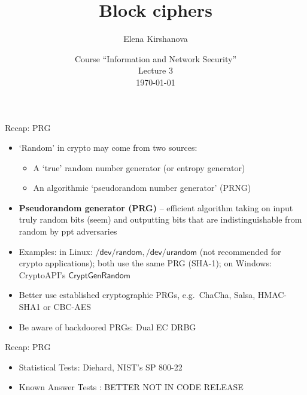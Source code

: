 \documentclass[usenames,dvipsnames, 9pt]{beamer}
\author{Elena Kirshanova \\ [10pt]
}
\title{\Huge Block ciphers}
\date{ Course ``Information and Network Security'' \\ 	
	Lecture 3 \\ \today }
\begin{document}
	
\begin{frame}
	\titlepage
\end{frame}


\begin{frame}{Recap: PRG}
\LARGE 

\begin{itemize}
\itemsep1em

\item `Random' in crypto may come from two sources:

\begin{itemize}
	\item A `true' random number generator (or entropy generator) 
	\item An algorithmic ‘pseudorandom number generator’ (PRNG) 
\end{itemize}

\item 	{\color{Orange}\textbf{Pseudorandom generator (PRG)}} -- efficient algorithm taking on input truly random bits (seem) and outputting bits that are indistinguishable from random by ppt adversaries 

\item Examples: in Linux: $\mathsf{/dev/random},\mathsf{/dev/urandom}$ (not recommended for crypto applications); both use the same PRG (SHA-1); on Windows: CryptoAPI's  $\mathsf{CryptGenRandom}$

\item Better use established cryptographic PRGs, e.g.\ ChaCha, Salsa, HMAC-SHA1 or CBC-AES

\item Be aware of backdoored PRGs:  Dual EC DRBG
\end{itemize}

\end{frame}

\begin{frame}{Recap: PRG}
\LARGE 

\begin{itemize}
	\itemsep1em
	\item Statistical Tests: Diehard, NIST’s SP 800-22
	\item Known Answer Tests : BETTER NOT IN CODE RELEASE
\end{itemize}
\end{frame}
\end{document}
